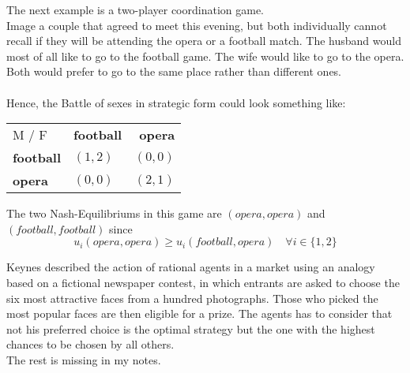 \begin{example} \label{battleofthesexes} 
		The next example is a two-player coordination game. \\
		Image a couple that agreed to meet this evening, but both individually cannot recall if they will be attending the opera or a football match. The husband would most of all like to go to the football game. The wife would like to go to the opera. Both would prefer to go to the same place rather than different ones. \\ \\
		Hence, the Battle of sexes in strategic form could look something like:
		
		\begin{center}
			\begin{tabular}{|l|l|r|}
				\hline\hline
  					M / F & \textbf{football} & \textbf{opera} \\
         				\cline{1-3}
   					\textbf{football} & $(1, 2)$ & $(0, 0)$ 	\arrayrulewidth2pt \\
            			\cline{1-3}
   					\textbf{opera} & $(0, 0)$ & $(2, 1)$ \\ \hline\hline
			\end{tabular}	
		\end{center}
		
		The two Nash-Equilibriums in this game are $(opera, opera)$ and $(football, football)$ since
		\[ u_{i}(opera, opera) \geq u_{i}(football, opera) \quad \forall i \in \{ 1, 2 \} \]
\end{example}

\begin{example}
Keynes described the action of rational agents in a market using an analogy based on a fictional newspaper contest, in which entrants are asked to choose the six most attractive faces from a hundred photographs. Those who picked the most popular faces are then eligible for a prize. The agents has to consider that not his preferred choice is the optimal strategy but the one with the highest chances to be chosen by all others. \\

	The rest is missing in my notes. %
\end{example}

